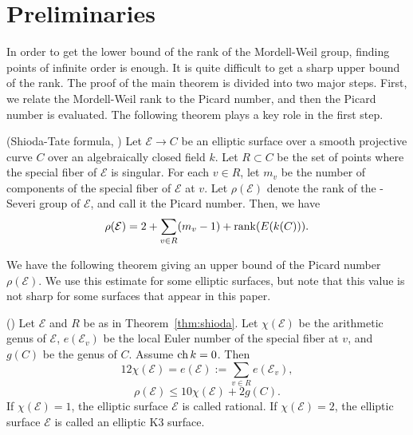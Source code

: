 \documentclass[main]{subfiles}
\begin{document}
\section{Preliminaries}

In order to get the lower bound of the rank of the Mordell-Weil group, finding points of infinite order is enough.
It is quite difficult to get a sharp upper bound of the rank.
The proof of the main theorem is divided into two major steps.
First, we relate the Mordell-Weil rank to the Picard number, and then the Picard number is evaluated.
The following theorem plays a key role in the first step.
\begin{thm}{(Shioda-Tate formula, \cite[Corollary 5.3]{ref:shioda1990})}
    \label{thm:shioda}
    Let $\mathcal{E} \to C$ be an elliptic surface over a smooth projective curve $C$ over an algebraically closed field $k$.
    Let $R \subset C$ be the set of points where the special fiber of $\mathcal{E}$ is singular.
    For each $v \in R$, let $m_{v}$ be the number of components of the special fiber of $\mathcal{E}$ at $v$.
    Let $\rho(\mathcal{E})$ denote the rank of the \Neron-Severi group of $\mathcal{E}$, and call it the Picard number.
    Then, we have
    \begin{equation*}
        \rho (\mathcal{E}) = 2 + \sum_{v \in R} (m_{v} - 1) + \operatorname{rank}(E(k(C))).
    \end{equation*}
\end{thm}

We have the following theorem giving an upper bound of the Picard number $\rho(\mathcal{E})$.
We use this estimate for some elliptic surfaces, but note that this value is not sharp for some surfaces that appear in this paper.
\begin{thm}{(\cite[Twierdzenie 2.2.9, 2.2.10, 2.2.19]{ref:naskreckiphd})}
    Let $\mathcal{E}$ and $R$ be as in Theorem~\ref{thm:shioda}.
    Let $\chi(\mathcal{E})$ be the arithmetic genus of $\mathcal{E}$, $e(\mathcal{E}_v)$ be the local Euler number of the special fiber at $v$, and $g(C)$ be the genus of $C$. \label{thm:rho}
    Assume $\operatorname{ch} k = 0$.
    Then
    \begin{equation*}
        12 \chi(\mathcal{E}) = e(\mathcal{E}) := \sum_{v \in R} e(\mathcal{E}_{v}),
    \end{equation*}
    \begin{equation*}
        \rho(\mathcal{E}) \leq 10 \chi(\mathcal{E}) + 2g(C).
    \end{equation*}
    If $\chi(\mathcal{E}) = 1$, the elliptic surface $\mathcal{E}$ is called rational.
    If $\chi(\mathcal{E}) = 2$, the elliptic surface $\mathcal{E}$ is called an elliptic K3 surface.
\end{thm}
\end{document}
